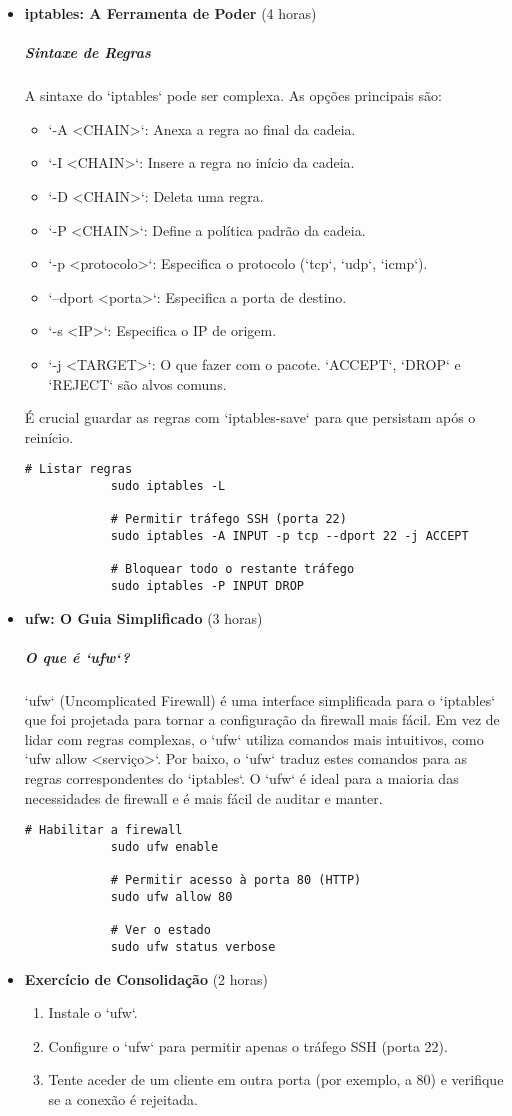 \documentclass[10pt,a4paper]{article}
\begin{document}
\begin{itemize}
		\item \textbf{iptables: A Ferramenta de Poder} (4 horas)
		\subparagraph{Sintaxe de Regras} A sintaxe do `iptables` pode ser complexa. As opções principais são:
		\begin{itemize}
			\item `-A <CHAIN>`: Anexa a regra ao final da cadeia.
			\item `-I <CHAIN>`: Insere a regra no início da cadeia.
			\item `-D <CHAIN>`: Deleta uma regra.
			\item `-P <CHAIN>`: Define a política padrão da cadeia.
			\item `-p <protocolo>`: Especifica o protocolo (`tcp`, `udp`, `icmp`).
			\item `--dport <porta>`: Especifica a porta de destino.
			\item `-s <IP>`: Especifica o IP de origem.
			\item `-j <TARGET>`: O que fazer com o pacote. `ACCEPT`, `DROP` e `REJECT` são alvos comuns.
		\end{itemize}
		É crucial guardar as regras com `iptables-save` para que persistam após o reinício.
		
		\begin{lstlisting}[caption=Exemplo de regras com iptables]
			# Listar regras
			sudo iptables -L
			
			# Permitir tráfego SSH (porta 22)
			sudo iptables -A INPUT -p tcp --dport 22 -j ACCEPT
			
			# Bloquear todo o restante tráfego
			sudo iptables -P INPUT DROP
		\end{lstlisting}
		
		\item \textbf{ufw: O Guia Simplificado} (3 horas)
		\subparagraph{O que é `ufw`?} `ufw` (Uncomplicated Firewall) é uma interface simplificada para o `iptables` que foi projetada para tornar a configuração da firewall mais fácil. Em vez de lidar com regras complexas, o `ufw` utiliza comandos mais intuitivos, como `ufw allow <serviço>`. Por baixo, o `ufw` traduz estes comandos para as regras correspondentes do `iptables`. O `ufw` é ideal para a maioria das necessidades de firewall e é mais fácil de auditar e manter.
		
		\begin{lstlisting}[caption=Exemplo de regras com ufw]
			# Habilitar a firewall
			sudo ufw enable
			
			# Permitir acesso à porta 80 (HTTP)
			sudo ufw allow 80
			
			# Ver o estado
			sudo ufw status verbose
		\end{lstlisting}
		
		\item \textbf{Exercício de Consolidação} (2 horas)
		\begin{enumerate}
			\item Instale o `ufw`.
			\item Configure o `ufw` para permitir apenas o tráfego SSH (porta 22).
			\item Tente aceder de um cliente em outra porta (por exemplo, a 80) e verifique se a conexão é rejeitada.
		\end{enumerate}
	\end{itemize}
	
\end{document}
